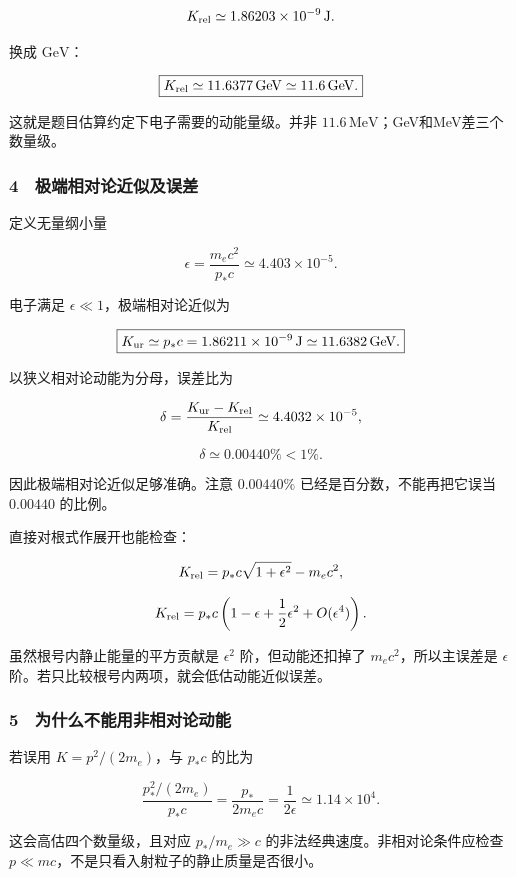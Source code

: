 \documentclass[12pt,a4paper,fontset=fandol]{ctexart}
\begin{document}
\[K_{\rm rel}\simeq1.86203\times10^{-9}\,\mathrm J.\]

换成 \(\mathrm{GeV}\)：

\[\boxed{K_{\rm rel}\simeq11.6377\,\mathrm{GeV}
\simeq11.6\,\mathrm{GeV}.}\]

这就是题目估算约定下电子需要的动能量级。并非
\(11.6\,\mathrm{MeV}\)；GeV和MeV差三个数量级。

\subsubsection{4　极端相对论近似及误差}\label{ux6781ux7aefux76f8ux5bf9ux8bbaux8fd1ux4f3cux53caux8befux5dee}

定义无量纲小量

\[\epsilon=\frac{m_ec^2}{p_*c}
\simeq4.403\times10^{-5}.\]

电子满足 \(\epsilon\ll1\)，极端相对论近似为

\[\boxed{K_{\rm ur}\simeq p_*c
=1.86211\times10^{-9}\,\mathrm J
\simeq11.6382\,\mathrm{GeV}.}\]

以狭义相对论动能为分母，误差比为

\[\delta=\frac{K_{\rm ur}-K_{\rm rel}}{K_{\rm rel}}
\simeq4.4032\times10^{-5},\]

\[\boxed{\delta\simeq0.00440\%<1\%.}\]

因此极端相对论近似足够准确。注意 \(0.00440\%\)
已经是百分数，不能再把它误当 \(0.00440\) 的比例。

直接对根式作展开也能检查：

\[K_{\rm rel}
=p_*c\sqrt{1+\epsilon^2}-m_ec^2,\]

\[K_{\rm rel}
=p_*c\left(1-\epsilon+\frac12\epsilon^2+O(\epsilon^4)\right).\]

虽然根号内静止能量的平方贡献是 \(\epsilon^2\) 阶，但动能还扣掉了
\(m_ec^2\)，所以主误差是 \(\epsilon\)
阶。若只比较根号内两项，就会低估动能近似误差。

\subsubsection{5　为什么不能用非相对论动能}\label{ux4e3aux4ec0ux4e48ux4e0dux80fdux7528ux975eux76f8ux5bf9ux8bbaux52a8ux80fd}

若误用 \(K=p^2/(2m_e)\)，与 \(p_*c\) 的比为

\[\frac{p_*^2/(2m_e)}{p_*c}
=\frac{p_*}{2m_ec}=\frac1{2\epsilon}
\simeq1.14\times10^4.\]

这会高估四个数量级，且对应 \(p_*/m_e\gg c\)
的非法经典速度。非相对论条件应检查
\(p\ll mc\)，不是只看入射粒子的静止质量是否很小。
\end{document}
